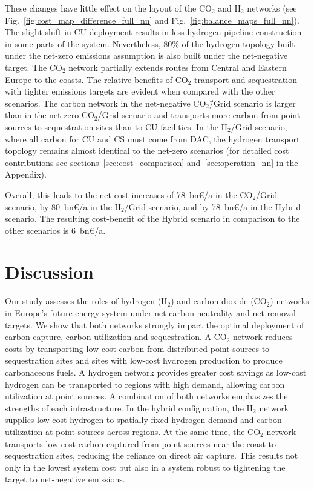 \documentclass[twocolumn]{article}
\newcommand{\carbon}{CO$_2$}
\newcommand{\hydrogen}{H$_2$}
\newcommand{\carbonscenario}{CO$_2$\=/Grid scenario}
\newcommand{\hydrogenscenario}{H$_2$\=/Grid scenario}
\newcommand{\hybridscenario}{Hybrid scenario}
\begin{document}
These changes have little effect on the layout of the \carbon{} and \hydrogen{} networks (see Fig.~\ref{fig:cost_map_difference_full_nn} and Fig.~\ref{fig:balance_maps_full_nn}).
The slight shift in CU deployment results in less hydrogen pipeline construction in some parts of the system. Nevertheless, 80\% of the hydrogen topology built under the net-zero emissions assumption is also built under the net-negative target. The \carbon{} network partially extends routes from Central and Eastern Europe to the coasts. The relative benefits of \carbon{} transport and sequestration with tighter emissions targets are evident when compared with the other scenarios. The carbon network in the net-negative \carbonscenario{} is larger than in the net-zero \carbonscenario{} and transports more carbon from point sources to sequestration sites than to CU facilities. In the \hydrogenscenario{}, where all carbon for CU and CS must come from DAC, the hydrogen transport topology remains almost identical to the net-zero scenarios (for detailed cost contributions see sections~\ref{sec:cost_comparison} and~\ref{sec:operation_nn} in the Appendix).


Overall, this leads to the net cost increases of 78~bn€/a in the \carbonscenario{}, by 80~bn€/a in the \hydrogenscenario{}, and by 78~bn€/a in the \hybridscenario{}. The resulting cost-benefit of the \hybridscenario{} in comparison to the other scenarios is 6~bn€/a.


\section{Discussion}
\label{sec:conclusion}
Our study assesses the roles of hydrogen (\hydrogen{}) and carbon dioxide (\carbon{}) networks in Europe's future energy system under net carbon neutrality and net-removal targets. We show that both networks strongly impact the optimal deployment of carbon capture, carbon utilization and sequestration. A \carbon{} network reduces costs by transporting low-cost carbon from distributed point sources to sequestration sites and sites with low-cost hydrogen production to produce carbonaceous fuels. A hydrogen network provides greater cost savings as low-cost hydrogen can be transported to regions with high demand, allowing carbon utilization at point sources. A combination of both networks emphasizes the strengths of each infrastructure. In the hybrid configuration, the \hydrogen{} network supplies low-cost hydrogen to spatially fixed hydrogen demand and carbon utilization at point sources across regions. At the same time, the \carbon{} network transports low-cost carbon captured from point sources near the coast to sequestration sites, reducing the reliance on direct air capture. This results not only in the lowest system cost but also in a system robust to tightening the target to net-negative emissions.
\end{document}

